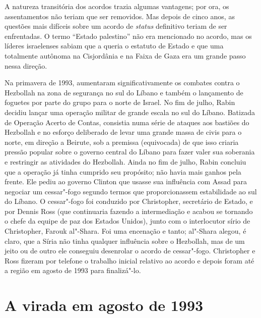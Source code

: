 A natureza transitória dos acordos trazia algumas vantagens; por ora, os
assentamentos não teriam que ser removidos. Mas depois de cinco anos, as
questões mais difíceis sobre um acordo de \emph{status} definitivo teriam de
ser enfrentadas. O termo ``Estado palestino'' não era mencionado no
acordo, mas os líderes israelenses sabiam que a  queria o estatuto de
Estado e que uma  totalmente autônoma na Cisjordânia e na Faixa de
Gaza era um grande passo nessa direção.

Na primavera de 1993, aumentaram significativamente os combates contra o
Hezbollah na zona de segurança no sul do Líbano e também o lançamento de
foguetes por parte do grupo para o norte de Israel. No fim de julho,
Rabin decidiu lançar uma operação militar de grande escala no sul do
Líbano. Batizada de Operação Acerto de Contas, consistia numa série de
ataques aos bastiões do Hezbollah e no esforço deliberado de levar uma
grande massa de civis para o norte, em direção a Beirute, sob a premissa
(equivocada) de que isso criaria pressão popular sobre o governo central
do Líbano para fazer valer sua soberania e restringir as atividades do
Hezbollah. Ainda no fim de julho, Rabin concluiu que a operação já tinha
cumprido seu propósito; não havia mais ganhos pela frente. Ele pediu ao
governo Clinton que usasse sua influência com Assad para negociar um
cessar"-fogo segundo termos que proporcionassem estabilidade ao sul do
Líbano. O cessar"-fogo foi conduzido por Christopher, secretário de
Estado, e por Dennis Ross (que continuaria fazendo a intermediação e
acabou se tornando o chefe da equipe de paz dos Estados Unidos), junto
com o interlocutor sírio de Christopher, Farouk al"-Shara. Foi uma
encenação e tanto; al"-Shara alegou, é claro, que a Síria não tinha
qualquer influência sobre o Hezbollah, mas de um jeito ou de outro ele
conseguiu desenrolar o acordo de cessar"-fogo. Christopher e Ross fizeram
por telefone o trabalho inicial relativo ao acordo e depois foram até a
região em agosto de 1993 para finalizá"-lo.

\section{A virada em agosto de 1993}

